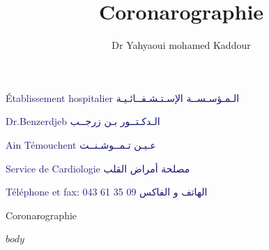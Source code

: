 \documentclass[12pt,a4paper]{article}
\author{Dr Yahyaoui mohamed Kaddour}
\title{Coronarographie }
\begin{document}
 \textcolor{MidnightBlue}{Établissement hospitalier \hfill \textarabic{الـمـؤسـســة الإسـتـشـفــائـيـة}}
 
 \textcolor{MidnightBlue}{Dr.Benzerdjeb \hfill \textarabic{الـدكـتــور بـن زرجــب}}
 
 
 
\textcolor{MidnightBlue}{ Ain Témouchent \hfill \textarabic{عـيـن تـمــوشـنــت}}
 
\textcolor{MidnightBlue}{Service de Cardiologie \hfill \textarabic{مصلحة أمراض القلب}}
 
 \textcolor{MidnightBlue}{Téléphone et fax:  043 61 35 09 \hfill \textarabic{الهاتف و الفاكس}}

\begin{center} \huge{ Coronarographie}
	

\end{center}


$body$
\fancyfoot[R]{\today}
\end{document}
